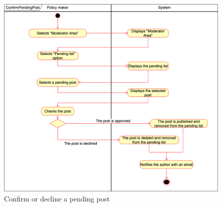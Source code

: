 \begin{figure}[h!]
        \centering
        \includegraphics[scale=0.35]{images/use_cases_diagram/policymaker_pending_post.png}
        \caption{Confirm or decline a pending post}
        \label{fig:policymaker_pending_post}
    \end{figure}
\FloatBarrier
    
    \newpage
    
